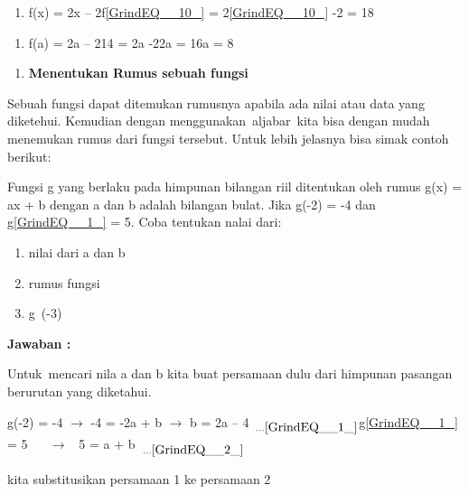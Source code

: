 \documentclass[11pt,fleqn]{book} %
\begin{document}
\begin{enumerate}
\item  f(x) = 2x -- 2f\eqref{GrindEQ__10_} = 2\eqref{GrindEQ__10_} -2 = 18
\end{enumerate}

\noindent 

\begin{enumerate}
\item  f(a) = 2a -- 214 = 2a -22a = 16a = 8
\end{enumerate}

\noindent 

\begin{enumerate}
\item  \textbf{ Menentukan Rumus sebuah fungsi}
\end{enumerate}

\noindent 

\noindent Sebuah fungsi dapat ditemukan rumusnya apabila ada nilai atau data yang diketehui. Kemudian dengan menggunakan~aljabar~kita bisa dengan mudah menemukan rumus dari fungsi tersebut. Untuk lebih jelasnya bisa simak contoh berikut:

\noindent 

\noindent Fungsi g yang berlaku pada himpunan bilangan riil ditentukan oleh rumus g(x) = ax + b dengan a dan b adalah bilangan bulat. Jika g(-2) = -4 dan g\eqref{GrindEQ__1_} = 5. Coba tentukan nalai dari:

\noindent 

\begin{enumerate}
\item  nilai dari a dan b

\item  rumus fungsi

\item  g~(-3)
\end{enumerate}

\noindent 

\textbf{Jawaban :}

\textbf{}

\noindent Untuk~mencari nila a dan b kita buat persamaan dulu dari himpunan pasangan berurutan yang diketahui.

\noindent g(-2) = -4 $\mathrm{\to}$ -4 = -2a + b $\mathrm{\to}$ b = 2a -- 4~${}_{{\dots}\eqref{GrindEQ__1_}}$g\eqref{GrindEQ__1_} = 5 ~ ~$\mathrm{\to}$ ~5 = a + b~${}_{{\dots}\eqref{GrindEQ__2_}}$

\noindent kita substitusikan persamaan 1 ke persamaan 2
\end{document}

